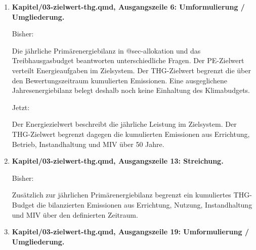 \documentclass[
  ngerman,
  a4paper,
  DIV=11]{scrreprt}
\newenvironment{Shaded}{\begin{snugshade}}{\end{snugshade}}
\newcommand{\NormalTok}[1]{\textcolor[rgb]{0.00,0.23,0.31}{#1}}
\begin{document}
\begin{enumerate}
  Jetzt:

\begin{Shaded}
\begin{Highlighting}[]
\NormalTok{::: \{.callout{-}note title="Parameterstand"\}}
\NormalTok{Der Entwurf definiert die typologische Zuordnung und Aggregationsregel. Numerische Sanierungswerte je Typ sind nicht festgelegt. Die historische Pauschale ist ausschließlich als Vergleichsstand dokumentiert.}
\end{Highlighting}
\end{Shaded}
\item
  \textbf{Kapitel/03-zielwert-thg.qmd, Ausgangszeile 6: Umformulierung /
  Umgliederung.}

  Bisher:

\begin{Shaded}
\begin{Highlighting}[]
\NormalTok{Die jährliche Primärenergiebilanz in @sec{-}allokation und das Treibhausgasbudget beantworten unterschiedliche Fragen. Der PE{-}Zielwert verteilt Energieaufgaben im Zielsystem. Der THG{-}Zielwert begrenzt die über den Bewertungszeitraum kumulierten Emissionen. Eine ausgeglichene Jahresenergiebilanz belegt deshalb noch keine Einhaltung des Klimabudgets.}
\end{Highlighting}
\end{Shaded}

  Jetzt:

\begin{Shaded}
\begin{Highlighting}[]
\NormalTok{Der Energiezielwert beschreibt die jährliche Leistung im Zielsystem. Der THG{-}Zielwert begrenzt dagegen die kumulierten Emissionen aus Errichtung, Betrieb, Instandhaltung und MIV über 50 Jahre.}
\end{Highlighting}
\end{Shaded}
\item
  \textbf{Kapitel/03-zielwert-thg.qmd, Ausgangszeile 13: Streichung.}

  Bisher:

\begin{Shaded}
\begin{Highlighting}[]
\NormalTok{Zusätzlich zur jährlichen Primärenergiebilanz begrenzt ein kumuliertes THG{-}Budget die bilanzierten Emissionen aus Errichtung, Nutzung, Instandhaltung und MIV über den definierten Zeitraum.}
\end{Highlighting}
\end{Shaded}
\item
  \textbf{Kapitel/03-zielwert-thg.qmd, Ausgangszeile 19: Umformulierung
  / Umgliederung.}
\end{enumerate}
\end{document}
